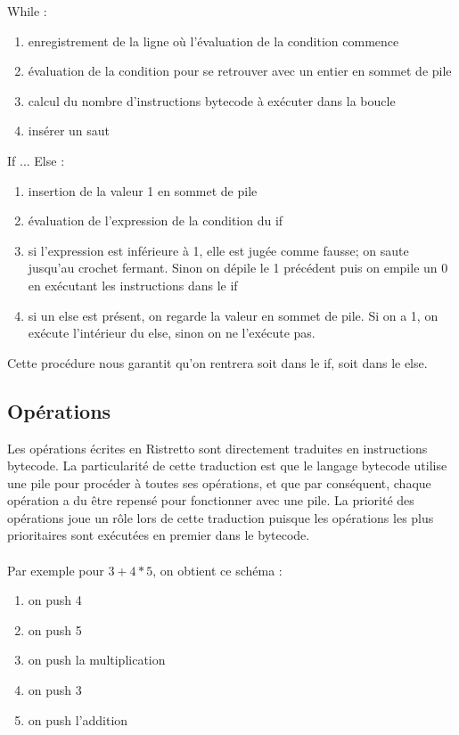 \documentclass[12pt]{report}
\begin{document}
\noindent While :
\begin{enumerate}
	\itemsep0em 
	\item enregistrement de la ligne où l'évaluation de la condition commence
	\item évaluation de la condition pour se retrouver avec un entier en sommet de pile
	\item calcul du nombre d'instructions bytecode à exécuter dans la boucle
	\item insérer un saut
\end{enumerate}

\newpage
\noindent If ... Else :
\begin{enumerate}
	\itemsep0em 
	\item insertion de la valeur 1 en sommet de pile
	\item évaluation de l'expression de la condition du if
	\item si l'expression est inférieure à 1, elle est jugée comme fausse; on saute jusqu'au crochet fermant. Sinon on dépile le 1 précédent puis on empile un 0 en exécutant les instructions dans le if
	\item si un else est présent, on regarde la valeur en sommet de pile. Si on a 1, on exécute l'intérieur du else, sinon on ne l'exécute pas.
\end{enumerate}

\noindent Cette procédure nous garantit qu'on rentrera soit dans le if, soit dans le else.

\subsection{Opérations}
Les opérations écrites en Ristretto sont directement traduites en instructions bytecode. La particularité de cette traduction est que le langage bytecode utilise une pile pour procéder à toutes ses opérations, et que par conséquent, chaque opération a du être repensé pour fonctionner avec une pile. La priorité des opérations joue un rôle lors de cette traduction puisque les opérations les plus prioritaires sont exécutées en premier dans le bytecode.\\\\
Par exemple pour $3 + 4 * 5$, on obtient ce schéma :
\begin{enumerate}
	\itemsep0em 
	\item on push 4
	\item on push 5
	\item on push la multiplication
	\item on push 3
	\item on push l'addition
\end{enumerate}
\end{document}
